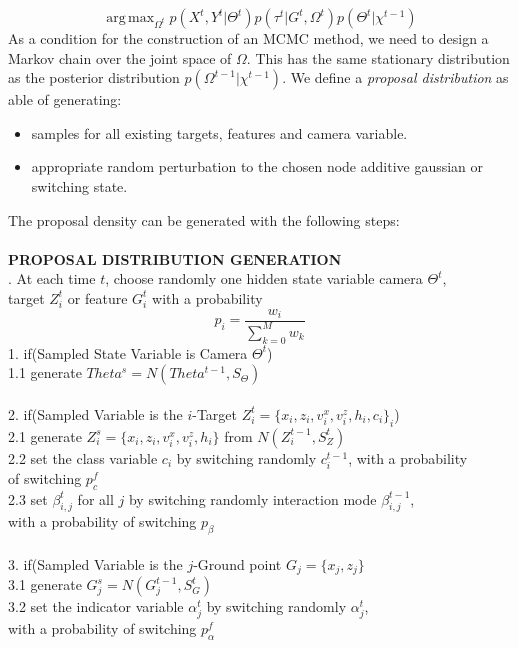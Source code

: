 \[
 \operatorname{arg\,max}_{\Omega^{t}} p(X^{t}, Y^t |\Theta^{t}) p(\tau^{t} | G^t ,\Omega^{t}) p(\Theta^{t} |\chi^{t-1}) 
\]
As a condition for the construction of an MCMC method, we need to design a Markov chain over the joint space of $\Omega$. 
This has the same stationary distribution as the posterior distribution 
$p(\Omega^{t-1} |\chi^{t-1})$. 
We define a \textit{proposal distribution} as able of generating:
\begin{itemize}
\item samples for all existing targets, features and camera variable. 
\item appropriate random perturbation to the chosen node additive gaussian or switching state.
\end{itemize}
The proposal density can be generated with the following steps: 
\\
\\
{\bf PROPOSAL DISTRIBUTION GENERATION}\\[.4cm]
{. \hspace*{0.2cm} At each time $t$, choose randomly one hidden state variable camera  $\Theta^t$,\\
\hspace*{0.9cm} target $Z_i^t$ or feature $G_i^t$ with a probability
$$
  p_i=\frac{w_i}{\sum_{k=0}^{M} w_k}
$$
1.  \hspace*{0.2cm} if(Sampled State Variable is Camera $\Theta^t$) \\
1.1 \hspace*{0.4cm} generate $Theta^s=N(Theta^{t-1},S_{\Theta})$\\
\\
2.  \hspace*{0.2cm} if(Sampled Variable is the $i$-Target $Z_i^t=\{x_i, z_i, v_i^x , v_i^z , h_i,c_i \}_i$) \\ 
2.1 \hspace*{0.4cm} generate $Z_i^s=\{x_i, z_i, v_i^x , v_i^z , h_i \}$ from $N(Z_i^{t-1},S_{Z}^t)$ \\
2.2 \hspace*{0.4cm} set the class variable $c_i$ by switching randomly $c_i^{t-1}$, with a probability \\ 
\hspace*{0.9cm} of switching $p_{c}^f$ \\
2.3 \hspace*{0.4cm} set $\beta_{i,j}^t$ for all $j$ by switching randomly interaction mode $\beta_{i,j}^{t-1}$, \\ 
\hspace*{0.9cm}  with a probability of switching $p_{\beta}$ \\
\\
3.  \hspace*{0.2cm} if(Sampled Variable is the $j$-Ground point $G_j=\{x_j, z_j\}$ \\
3.1 \hspace*{0.4cm} generate $G_j^s=N(G_j^{t-1},S_G^t)$ \\
3.2 \hspace*{0.4cm} set the indicator variable $\alpha_j^t$ by switching randomly $\alpha_j^t$,\\
\hspace*{0.9cm}  with a probability of switching $p_{\alpha}^f$ 
}\\[.4cm]
